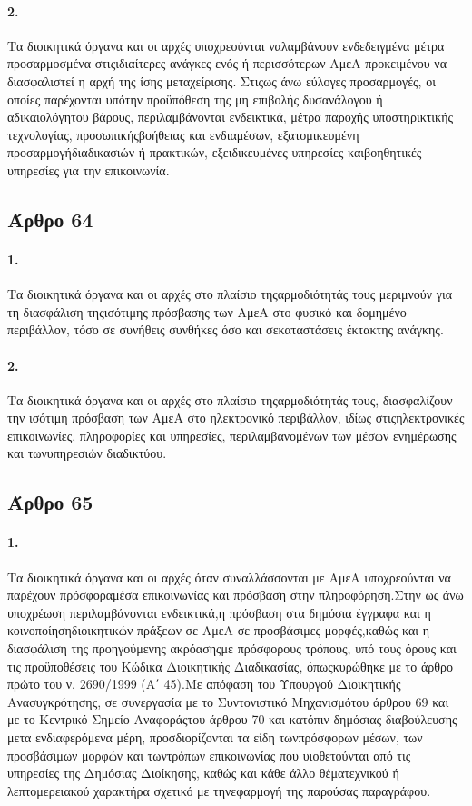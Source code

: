 \documentclass[a4paper,oneside, 10pt]{book}
\begin{document}
\paragraph { 2. } Τα διοικητικά όργανα και οι αρχές υποχρεούνται ναλαμβάνουν ενδεδειγμένα μέτρα προσαρμοσμένα στιςιδιαίτερες ανάγκες ενός ή περισσότερων ΑμεΑ προκειμένου να διασφαλιστεί η αρχή της ίσης μεταχείρισης. Στιςως άνω εύλογες προσαρμογές, οι οποίες παρέχονται υπότην προϋπόθεση της μη επιβολής δυσανάλογου ή αδικαιολόγητου βάρους, περιλαμβάνονται ενδεικτικά, μέτρα παροχής υποστηρικτικής τεχνολογίας, προσωπικήςβοήθειας και ενδιαμέσων, εξατομικευμένη προσαρμογήδιαδικασιών ή πρακτικών, εξειδικευμένες υπηρεσίες καιβοηθητικές υπηρεσίες για την επικοινωνία.
\subsection*{ Άρθρο 64 }
\paragraph { 1. } Τα διοικητικά όργανα και οι αρχές στο πλαίσιο τηςαρμοδιότητάς τους μεριμνούν για τη διασφάλιση τηςισότιμης πρόσβασης των ΑμεΑ στο φυσικό και δομημένο περιβάλλον, τόσο σε συνήθεις συνθήκες όσο και σεκαταστάσεις έκτακτης ανάγκης.
\paragraph { 2. } Τα διοικητικά όργανα και οι αρχές στο πλαίσιο τηςαρμοδιότητάς τους, διασφαλίζουν την ισότιμη πρόσβαση των ΑμεΑ στο ηλεκτρονικό περιβάλλον, ιδίως στιςηλεκτρονικές επικοινωνίες, πληροφορίες και υπηρεσίες, περιλαμβανομένων των μέσων ενημέρωσης και τωνυπηρεσιών διαδικτύου.
\subsection*{ Άρθρο 65 }
\paragraph { 1. } Τα διοικητικά όργανα και οι αρχές όταν συναλλάσσονται με ΑμεΑ υποχρεούνται να παρέχουν πρόσφοραμέσα επικοινωνίας και πρόσβαση στην πληροφόρηση.Στην ως άνω υποχρέωση περιλαμβάνονται ενδεικτικά,η πρόσβαση στα δημόσια έγγραφα και η κοινοποίησηδιοικητικών πράξεων σε ΑμεΑ σε προσβάσιμες μορφές,καθώς και η διασφάλιση της προηγούμενης ακρόασηςμε πρόσφορους τρόπους, υπό τους όρους και τις προϋποθέσεις του Κώδικα Διοικητικής Διαδικασίας, όπωςκυρώθηκε με το άρθρο πρώτο του ν. 2690/1999 (Α΄ 45).Με απόφαση του Υπουργού Διοικητικής Ανασυγκρότησης, σε συνεργασία με το Συντονιστικό Μηχανισμότου άρθρου 69 και με το Κεντρικό Σημείο Αναφοράςτου άρθρου 70 και κατόπιν δημόσιας διαβούλευσης μετα ενδιαφερόμενα μέρη, προσδιορίζονται τα είδη τωνπρόσφορων μέσων, των προσβάσιμων μορφών και τωντρόπων επικοινωνίας που υιοθετούνται από τις υπηρεσίες της Δημόσιας Διοίκησης, καθώς και κάθε άλλο θέματεχνικού ή λεπτομερειακού χαρακτήρα σχετικό με τηνεφαρμογή της παρούσας παραγράφου.
\end{document}
